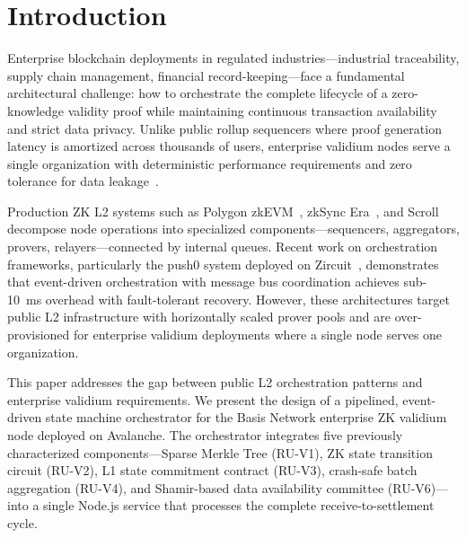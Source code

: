 
\section{Introduction}

Enterprise blockchain deployments in regulated industries---industrial
traceability, supply chain management, financial record-keeping---face a
fundamental architectural challenge: how to orchestrate the complete
lifecycle of a zero-knowledge validity proof while maintaining continuous
transaction availability and strict data privacy. Unlike public rollup
sequencers where proof generation latency is amortized across thousands of
users, enterprise validium nodes serve a single organization with
deterministic performance requirements and zero tolerance for data
leakage~\cite{ethereum2024zkrollups}.

Production ZK L2 systems such as Polygon zkEVM~\cite{polygon2024architecture,
hermez2023deepdive}, zkSync Era~\cite{zksync2025lifecycle, zksync2025server},
and Scroll~\cite{scroll2023architecture, scroll2025euclid} decompose node
operations into specialized components---sequencers, aggregators, provers,
relayers---connected by internal queues. Recent work on orchestration
frameworks, particularly the push0 system deployed on
Zircuit~\cite{push0_2025orchestration}, demonstrates that event-driven
orchestration with message bus coordination achieves sub-10~ms overhead with
fault-tolerant recovery. However, these architectures target public L2
infrastructure with horizontally scaled prover pools and are
over-provisioned for enterprise validium deployments where a single node
serves one organization.

This paper addresses the gap between public L2 orchestration patterns and
enterprise validium requirements. We present the design of a pipelined,
event-driven state machine orchestrator for the Basis Network enterprise
ZK validium node deployed on Avalanche. The orchestrator integrates five
previously characterized components---Sparse Merkle Tree (RU-V1), ZK state
transition circuit (RU-V2), L1 state commitment contract (RU-V3), crash-safe
batch aggregation (RU-V4), and Shamir-based data availability committee
(RU-V6)---into a single Node.js service that processes the complete
receive-to-settlement cycle.

